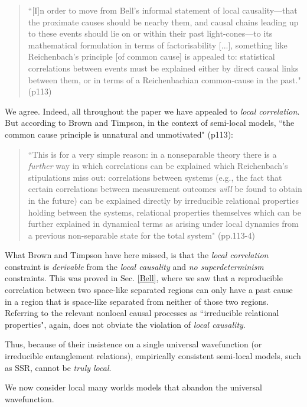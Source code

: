 \documentclass[12pt]{article}
\begin{document}
\begin{quote}
``[I]n order to move from Bell's informal statement of local causality---that the proximate causes should be nearby them, and causal chains leading up to these events should lie on or within their past light-cones---to its mathematical formulation in terms of factorisability [...], something like Reichenbach's principle [of common cause] is appealed to: statistical correlations between events must be explained either by direct causal links  between them, or in terms of a Reichenbachian common-cause in the past."  (p113)
\end{quote}

We agree. Indeed, all throughout the paper we have appealed to \textit{local correlation}. But according to Brown and Timpson, in the context of semi-local models, ``the common cause principle is unnatural and unmotivated" (p113):

\begin{quote}
``This is for a very simple reason: in a nonseparable theory there is a \textit{further} way in which correlations can be explained which Reichenbach's stipulations miss out: correlations between systems (e.g., the fact that certain correlations between measurement outcomes \textit{will} be found to obtain in the future) can be explained directly by irreducible relational properties holding between the systems, relational properties themselves which can be further explained in dynamical terms as arising under local dynamics from a previous non-separable state for the total system" (pp.113-4)
\end{quote}

What Brown and Timpson have here missed, is that the \textit{local correlation} constraint is \textit{derivable} from the \textit{local causality} and \textit{no superdeterminism} constraints. This was proved in Sec. \ref{Bell}, where we saw that a reproducible correlation between two space-like separated regions can only have a past cause in a region that is space-like separated from neither of those two regions. Referring to the relevant nonlocal causal processes as ``irreducible relational properties", again, does not obviate the violation of  \textit{local causality}.

Thus, because of their insistence on a single universal wavefunction (or irreducible entanglement relations), empirically consistent semi-local models, such as SSR, cannot be \textit{truly local}.  
 
We now consider local many worlds models that abandon the universal wavefunction.
\end{document}
